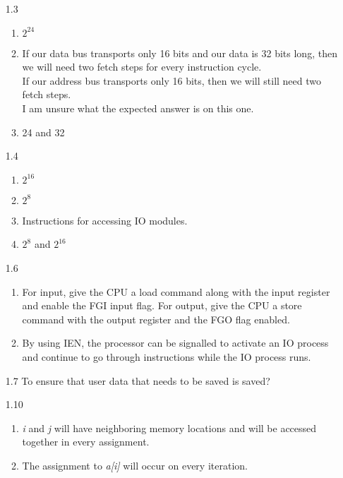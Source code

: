 \documentclass{article}
\begin{document}
\begin{enumerate}
\item[1.3]
 \begin{enumerate}
  \item $2^{24}$
  \item
   If our data bus transports only 16 bits and our data is 32 bits long, then
   we will need two fetch steps for every instruction cycle.\\ If our address
   bus transports only 16 bits, then we will still need two fetch steps.\\
   I am unsure what the expected answer is on this one.
  \item 24 and 32
 \end{enumerate}

\item[1.4]
 \begin{enumerate}
  \item $2^{16}$
  \item $2^8$
  \item Instructions for accessing IO modules.
  \item $2^8$ and $2^{16}$
 \end{enumerate}

\item[1.6]
 \begin{enumerate}
  \item For input, give the CPU a load command along with the input register
  and enable the FGI input flag. For output, give the CPU a store command with
  the output register and the FGO flag enabled.
  \item By using IEN, the processor can be signalled to activate an IO process
  and continue to go through instructions while the IO process runs.
 \end{enumerate}

\item[1.7]
 To ensure that user data that needs to be saved is saved?

\item[1.10]
  \begin{enumerate}
   \item \emph{i} and \emph{j} will have neighboring memory locations and will
   be accessed together in every assignment.
   \item The assignment to \emph{a[i]} will occur on every iteration.
  \end{enumerate}


\end{enumerate}
\end{document}
